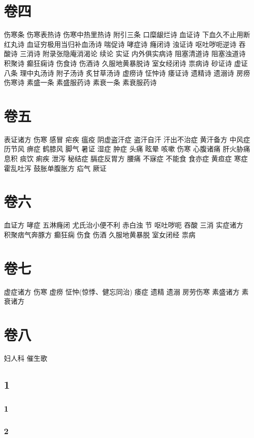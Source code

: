 \documentclass[a4paper,12pt,UTF8,twoside]{ctexbook}
\begin{document}
\part{卷四}
伤寒条
伤寒表热诗
伤寒中热里热诗
附引三条
口糜龈烂诗
血证诗
下血久不止用断红丸诗
血证穷极用当归补血汤诗
喘促诗
哮症诗
癃闭诗
浊证诗
呕吐哕呃逆诗
吞酸诗
三消诗
附录张隐庵消渴论
续论
实证
内外俱实病诗
阻塞清道诗
阻塞浊道诗
积聚诗
癫狂痫诗
伤食诗
伤酒诗
久服地黄暴脱诗
室女经闭诗
祟病诗
砂证诗
虚证八条
理中丸汤诗
附子汤诗 
炙甘草汤诗
虚痨诗
怔忡诗
痿证诗
遗精诗
遗溺诗
房痨伤寒诗
素盛一条 
素盛服药诗
素衰一条 
素衰服药诗
\part{卷五}
表证诸方
伤寒
感冒
疟疾
瘟疫
阴虚盗汗症
盗汗自汗
汗出不治症
黄汗备方
中风症
历节风
痹症
鹤膝风
脚气
暑证
湿症
肿症
头痛
眩晕
咳嗽
伤寒
心腹诸痛
肝火胁痛
息积
痰饮
痢疾
泄泻
秘结症
膈症反胃方
腰痛
不寐症
不能食
食亦症
黄疸症
寒症
霍乱吐泻
鼓胀单腹胀方
疝气
厥证
\part{卷六}
血证方
哮症
五淋癃闭
尤氏治小便不利
赤白浊 节
呕吐哕呃
吞酸
三消
实症诸方
积聚痞气奔豚方
癫狂痫
伤食
伤酒
久服地黄暴脱
室女闭经
祟病
\part{卷七}
虚症诸方
伤寒
虚痨
怔忡(惊悸、健忘同治) 
痿症
遗精
遗溺
房劳伤寒
素盛诸方
素衰诸方
\part{卷八}
妇人科
催生歌


\chapter{1}
\section{1}
\section{2}
\end{document}

